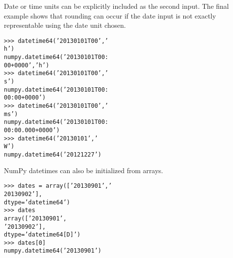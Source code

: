 \documentclass[11pt]{article} %
\begin{document}
Date or time units can be explicitly included as the second input. The final example shows that rounding
can occur if the date input is not exactly representable using the date unit chosen.
\begin{framed}
\begin{verbatim}
>>> datetime64(’20130101T00’,’
h’)
numpy.datetime64(’20130101T00:
00+0000’,’h’)
>>> datetime64(’20130101T00’,’
s’)
numpy.datetime64(’20130101T00:
00:00+0000’)
>>> datetime64(’20130101T00’,’
ms’)
numpy.datetime64(’20130101T00:
00:00.000+0000’)
>>> datetime64(’20130101’,’
W’)
numpy.datetime64(’20121227’)
\end{verbatim}
\end{framed}

NumPy datetimes can also be initialized from arrays.
\begin{framed}
\begin{verbatim}
>>> dates = array([’20130901’,’
20130902’],
dtype=’datetime64’)
>>> dates
array([’20130901’,
’20130902’],
dtype=’datetime64[D]’)
>>> dates[0]
numpy.datetime64(’20130901’)
\end{verbatim}
\end{framed}
\end{document}
